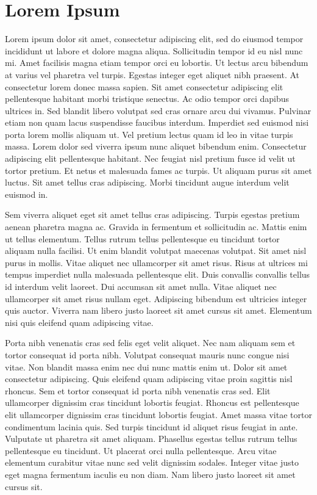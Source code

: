 \section{Lorem Ipsum}

Lorem ipsum dolor sit amet, consectetur adipiscing elit, sed do eiusmod tempor incididunt ut labore et dolore magna aliqua. Sollicitudin tempor id eu nisl nunc mi. Amet facilisis magna etiam tempor orci eu lobortis. Ut lectus arcu bibendum at varius vel pharetra vel turpis. Egestas integer eget aliquet nibh praesent. At consectetur lorem donec massa sapien. Sit amet consectetur adipiscing elit pellentesque habitant morbi tristique senectus. Ac odio tempor orci dapibus ultrices in. Sed blandit libero volutpat sed cras ornare arcu dui vivamus. Pulvinar etiam non quam lacus suspendisse faucibus interdum. Imperdiet sed euismod nisi porta lorem mollis aliquam ut. Vel pretium lectus quam id leo in vitae turpis massa. Lorem dolor sed viverra ipsum nunc aliquet bibendum enim. Consectetur adipiscing elit pellentesque habitant. Nec feugiat nisl pretium fusce id velit ut tortor pretium. Et netus et malesuada fames ac turpis. Ut aliquam purus sit amet luctus. Sit amet tellus cras adipiscing. Morbi tincidunt augue interdum velit euismod in.

Sem viverra aliquet eget sit amet tellus cras adipiscing. Turpis egestas pretium aenean pharetra magna ac. Gravida in fermentum et sollicitudin ac. Mattis enim ut tellus elementum. Tellus rutrum tellus pellentesque eu tincidunt tortor aliquam nulla facilisi. Ut enim blandit volutpat maecenas volutpat. Sit amet nisl purus in mollis. Vitae aliquet nec ullamcorper sit amet risus. Risus at ultrices mi tempus imperdiet nulla malesuada pellentesque elit. Duis convallis convallis tellus id interdum velit laoreet. Dui accumsan sit amet nulla. Vitae aliquet nec ullamcorper sit amet risus nullam eget. Adipiscing bibendum est ultricies integer quis auctor. Viverra nam libero justo laoreet sit amet cursus sit amet. Elementum nisi quis eleifend quam adipiscing vitae.

Porta nibh venenatis cras sed felis eget velit aliquet. Nec nam aliquam sem et tortor consequat id porta nibh. Volutpat consequat mauris nunc congue nisi vitae. Non blandit massa enim nec dui nunc mattis enim ut. Dolor sit amet consectetur adipiscing. Quis eleifend quam adipiscing vitae proin sagittis nisl rhoncus. Sem et tortor consequat id porta nibh venenatis cras sed. Elit ullamcorper dignissim cras tincidunt lobortis feugiat. Rhoncus est pellentesque elit ullamcorper dignissim cras tincidunt lobortis feugiat. Amet massa vitae tortor condimentum lacinia quis. Sed turpis tincidunt id aliquet risus feugiat in ante. Vulputate ut pharetra sit amet aliquam. Phasellus egestas tellus rutrum tellus pellentesque eu tincidunt. Ut placerat orci nulla pellentesque. Arcu vitae elementum curabitur vitae nunc sed velit dignissim sodales. Integer vitae justo eget magna fermentum iaculis eu non diam. Nam libero justo laoreet sit amet cursus sit.


